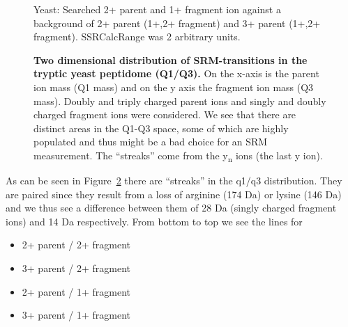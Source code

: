 \begin{figure}


\label{y_true_false}
\caption{Yeast: Searched 2+ parent and 1+ fragment ion against a background of 2+ parent (1+,2+ fragment) and 3+ parent (1+,2+ fragment).
SSRCalcRange was 2 arbitrary units.
}
\end{figure}

\begin{figure}
\caption{
\textbf{Two dimensional distribution of SRM-transitions in the tryptic
yeast peptidome (Q1/Q3).}
On the x-axis is the parent ion mass (Q1 mass) and
on the y axis the fragment ion mass (Q3 mass). Doubly and triply charged
parent ions and singly and doubly charged fragment ions were considered.
We see that there are distinct areas in the Q1-Q3 space, some of which are highly
populated and thus might be a bad choice for an SRM measurement. 
The ``streaks'' come from the y\textsubscript{n} ions (the last y ion).
}
%
\label{y_q1q3}

\end{figure}

As can be seen in Figure~\ref{y_q1q3} there are ``streaks'' in the q1/q3
distribution. They are paired since they result from a loss of arginine
(174 Da)
or lysine (146 Da) and we thus see a difference between them of 28 Da
(singly charged fragment ions) and 14 Da respectively. 
From bottom to top we see the lines for 
\begin{itemize}
\item 2+ parent / 2+ fragment
\item 3+ parent / 2+ fragment
\item 2+ parent / 1+ fragment
\item 3+ parent / 1+ fragment
\end{itemize}


